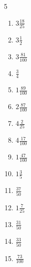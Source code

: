 \documentclass[12pt]{article}
\begin{document}
\begin{multicols}{5}
\begin{enumerate}
		\item $ 3 \frac{18}{25} $
		\item $ 3 \frac{1}{2} $
		\item $ 3 \frac{81}{100} $
		\item $ \frac{3}{4} $
		\item $ 1 \frac{89}{100} $
		\item $ 2 \frac{87}{100} $
		\item $ 4 \frac{2}{25} $
		\item $ 4 \frac{17}{100} $
		\item $ 1 \frac{47}{100} $
		\item $ 1 \frac{3}{5} $
		\item $ \frac{37}{50} $
		\item $ 1 \frac{7}{25} $
		\item $ \frac{31}{50} $
		\item $ \frac{33}{50} $
		\item $ \frac{73}{100} $
	\end{enumerate}\end{multicols}\newpage
\end{document}
